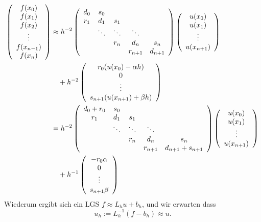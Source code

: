 \documentclass[
]{mycourse}
\theoremstyle{mythm}
\theoremstyle{break}
\begin{document}
\begin{align*}
\left( \begin{array}{c} f(x_0)\\ f(x_1)\\ f(x_2)\\ \vdots \\ f(x_{n-1})\\ f(x_n) \end{array}\right)&\approx
h^{-2} \left( \begin{array}{c c c c c} d_0 & s_0 \\
r_1 & d_1 & s_1 &  & \\ & \ddots & \ddots & \ddots & \\  &  & r_{n} & d_{n} & s_{n}\\
  &  & & r_{n+1} & d_{n+1} 
\end{array}\right) 
\left( \begin{array}{c} u(x_0) \\ u(x_1)\\  \vdots  \\ u(x_{n+1})\end{array}\right) \\
& \quad 
 + h^{-2} \left( \begin{array}{c} r_0 (u(x_0)-\alpha h)  \\ 0 \\ \vdots \\ s_{n+1} (u(x_{n+1})+\beta h) \end{array}\right)\\
%
& = h^{-2} \left( \begin{array}{c c c c c} d_0+r_0 & s_0 \\
r_1 & d_1 & s_1 &  & \\ & \ddots & \ddots & \ddots & \\  &  & r_{n} & d_{n} & s_{n}\\
  &  & & r_{n+1} & d_{n+1}+s_{n+1} 
\end{array}\right) 
\left( \begin{array}{c} u(x_0) \\ u(x_1)\\  \vdots  \\ u(x_{n+1})\end{array}\right)\\
 & \quad + h^{-1} \left( \begin{array}{c} -  r_0 \alpha  \\ 0 \\ \vdots \\ s_{n+1} \beta  \end{array}\right)
\end{align*}
Wiederum ergibt sich ein LGS $f\approx L_h u+b_h$, und wir erwarten dass
\[
u_h:=L_h^{-1} (f-b_h)\approx u.
\] 
\end{document}
